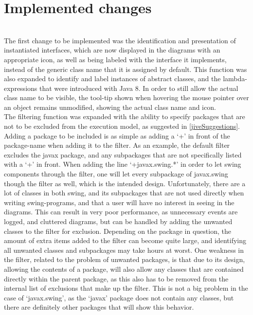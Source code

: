 \section{Implemented changes}\label{jiveImpl}%
~\\

The first change to be implemented was the identification and presentation of instantiated interfaces, which are now displayed in the diagrams with an appropriate icon, as well as being labeled with the interface it implements, instead of the generic class name that it is assigned by default.
This function was also expanded to identify and label instances of abstract classes, and the lambda-expressions that were introduced with Java 8.%
In order to still allow the actual class name to be visible, the tool-tip shown when hovering the mouse pointer over an object remains unmodified, showing the actual class name and icon.
~\\

The filtering function was expanded with the ability to specify packages that are not to be excluded from the execution model, as suggested in \autoref{jiveSuggestions}.
Adding a package to be included is as simple as adding a `+' in front of the package-name when adding it to the filter.
As an example, the default filter excludes the javax package, and any subpackages that are not specifically listed with a `+' in front.
When adding the line `+javax.swing.*' in order to let swing components through the filter, one will let every subpackage of javax.swing though the filter as well, which is the intended design.
Unfortunately, there are a lot of classes in both swing, and its subpackages that are not used directly when writing swing-programs, and that a user will have no interest in seeing in the diagrams.
This can result in very poor performance, as unnecessary events are logged, and cluttered diagrams, but can be handled by adding the unwanted classes to the filter for exclusion.
Depending on the package in question, the amount of extra items added to the filter can become quite large, and identifying all unwanted classes and subpackages may take hours at worst.
One weakness in the filter, related to the problem of unwanted packages, is that due to its design, allowing the contents of a package, will also allow any classes that are contained directly within the parent package, as this also has to be removed from the internal list of exclusions that make up the filter.
This is not a big problem in the case of `javax.swing', as the `javax' package does not contain any classes, but there are definitely other packages that will show this behavior.
~\\

